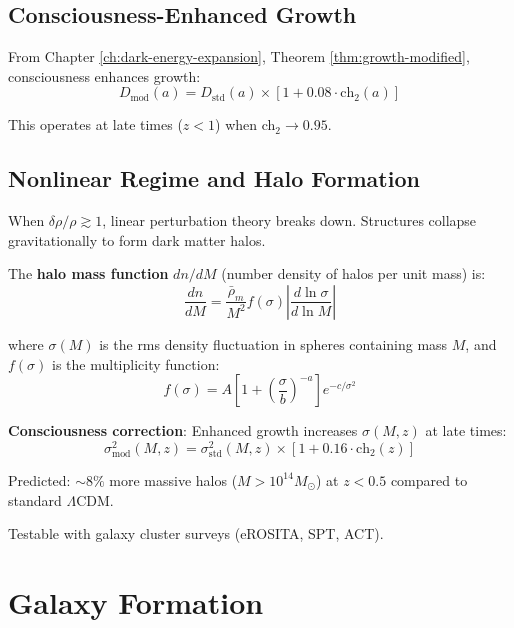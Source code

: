 \subsection{Consciousness-Enhanced Growth}

From Chapter \ref{ch:dark-energy-expansion}, Theorem \ref{thm:growth-modified}, consciousness enhances growth:
\begin{equation}
D_{\text{mod}}(a) = D_{\text{std}}(a) \times \left[ 1 + 0.08 \cdot \text{ch}_2(a) \right]
\end{equation}

This operates at late times ($z < 1$) when ch$_2 \to 0.95$.

\subsection{Nonlinear Regime and Halo Formation}

\begin{level2}
When $\delta \rho / \rho \gtrsim 1$, linear perturbation theory breaks down. Structures collapse gravitationally to form dark matter halos\cite{press1974,sheth1999}.

The \textbf{halo mass function} $dn/dM$ (number density of halos per unit mass) is:
\begin{equation}
\frac{dn}{dM} = \frac{\bar{\rho}_m}{M^2} f(\sigma) \left| \frac{d \ln \sigma}{d \ln M} \right|
\end{equation}

where $\sigma(M)$ is the rms density fluctuation in spheres containing mass $M$, and $f(\sigma)$ is the multiplicity function\cite{tinker2008}:
\begin{equation}
f(\sigma) = A \left[ 1 + \left( \frac{\sigma}{b} \right)^{-a} \right] e^{-c/\sigma^2}
\end{equation}

\textbf{Consciousness correction}: Enhanced growth increases $\sigma(M, z)$ at late times:
\begin{equation}
\sigma_{\text{mod}}^2(M, z) = \sigma_{\text{std}}^2(M, z) \times [1 + 0.16 \cdot \text{ch}_2(z)]
\end{equation}

Predicted: $\sim 8\%$ more massive halos ($M > 10^{14} M_\odot$) at $z < 0.5$ compared to standard $\Lambda$CDM.

Testable with galaxy cluster surveys (eROSITA, SPT, ACT)\cite{pillepich2018}.
\end{level2}

\section{Galaxy Formation}

